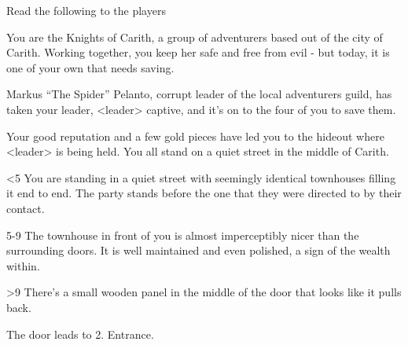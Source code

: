 

Read the following to the players

\begin{DndReadAloud}
You are the Knights of Carith, a group of adventurers based out of the city of Carith. Working together, you keep her safe and free from evil - but today, it is one of your own that needs saving.

Markus “The Spider” Pelanto, corrupt leader of the local adventurers guild, has taken your leader, <leader> captive, and it’s on to the four of you to save them.

Your good reputation and a few gold pieces have led you to the hideout where <leader> is being held. You all stand on a quiet street in the middle of Carith.
\end{DndReadAloud}

<5 You are standing in a quiet street with seemingly identical townhouses filling it end to end. The party stands before the one that they were directed to by their contact.

5-9 The townhouse in front of you is almost imperceptibly nicer than the surrounding doors. It is well maintained and even polished, a sign of the wealth within.

>9 There’s a small wooden panel in the middle of the door that looks like it pulls back.

The door leads to 2. Entrance.







